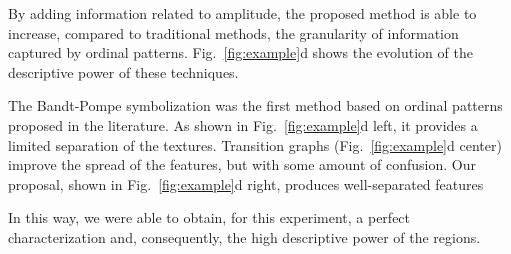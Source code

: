 \documentclass[journal]{IEEEtran}
\begin{document}
By adding information related to amplitude, the proposed method is able to increase, compared to traditional methods, the granularity of information captured by ordinal patterns.
Fig.~\ref{fig:example}d shows the evolution of the descriptive power of these techniques.

The Bandt-Pompe symbolization was the first method based on ordinal patterns proposed in the literature.
As shown in Fig.~\ref{fig:example}d left, it provides a limited separation of the textures.
Transition graphs (Fig.~\ref{fig:example}d center) improve the spread of the features, but with some amount of confusion.
Our proposal, shown in Fig.~\ref{fig:example}d right, produces well-separated features


In this way, we were able to obtain, for this experiment, a perfect characterization and, consequently, the high descriptive power of the regions.
\end{document}
